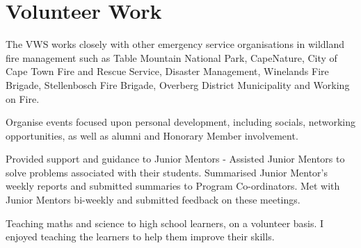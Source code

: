 \documentclass[]{deedy-resume-openfont}
\begin{document}
\begin{minipage}[t]{0.66\textwidth}

\section{Volunteer Work}

The VWS works closely with other emergency service organisations in wildland fire management such as Table Mountain National Park, CapeNature, City of Cape Town Fire and Rescue Service, Disaster Management, Winelands Fire Brigade, Stellenbosch Fire Brigade, Overberg District Municipality and Working on Fire.
\sectionsep

Organise events focused upon personal development, including socials, networking opportunities, as well as alumni and Honorary Member involvement. 
\sectionsep

Provided support and guidance to Junior Mentors - Assisted Junior Mentors to solve problems associated with their students. Summarised Junior Mentor’s weekly reports and submitted summaries to Program Co-ordinators. Met with Junior Mentors bi-weekly and submitted feedback on these meetings.
\sectionsep

Teaching maths and science to high school learners, on a volunteer basis. I enjoyed teaching the learners to help them improve their skills.
\sectionsep

\end{minipage} 
\end{document}
